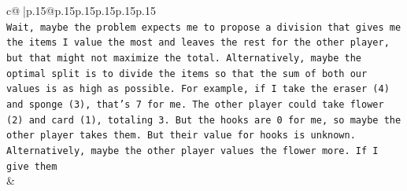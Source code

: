\documentclass{article}
\begin{document}
{\begin{supertabular}{c@{$\;$}|p{.15\linewidth}@{}p{.15\linewidth}p{.15\linewidth}p{.15\linewidth}p{.15\linewidth}p{.15\linewidth}}
{{{\\ 
\texttt{Wait, maybe the problem expects me to propose a division that gives me the items I value the most and leaves the rest for the other player, but that might not maximize the total. Alternatively, maybe the optimal split is to divide the items so that the sum of both our values is as high as possible. For example, if I take the eraser (4) and sponge (3), that's 7 for me. The other player could take flower (2) and card (1), totaling 3. But the hooks are 0 for me, so maybe the other player takes them. But their value for hooks is unknown. Alternatively, maybe the other player values the flower more. If I give them} \\
            }
        }
    }
    & \\ \\


\end{supertabular}}
\end{document}
